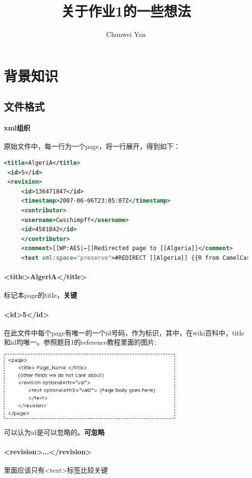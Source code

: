 \documentclass[a4paper]{ctexart}
\author{Chunwei Yan}
\title{关于作业1的一些想法}
\begin{document}
    \maketitle
\section{背景知识}
	\subsection{文件格式}
	
\paragraph{xml组织}
原始文件中，每一行为一个page，将一行展开，得到如下：
\begin{lstlisting}[language=XML]
 <title>AlgeriA</title>     
 <id>5</id>     
 <revision>       
	 <id>136471847</id>       
	 <timestamp>2007-06-06T23:05:07Z</timestamp>       
	 <contributor>         
	 <username>Cwschimpff</username>         
	 <id>4581842</id>       
	 </contributor>       
	 <comment>[[WP:AES|←]]Redirected page to [[Algeria]]</comment>       
	 <text xml:space="preserve">#REDIRECT [[Algeria]] {{R from CamelCase}}</text>     </revision>
\end{lstlisting}
\paragraph{ <title>AlgeriA</title>}
标记本page的title，\textbf{关键}
\paragraph{
 <id>5</id>     
}
在此文件中每个page有唯一的一个id号码，作为标识，其中，在wiki百科中，title和id均唯一。参照题目1的reference教程里面的图片;
\begin{center} 
    \includegraphics[width=0.7\textwidth]{image001.png}
\end{center}
可以认为id是可以忽略的。\textbf{可忽略}
\paragraph{
 <revision>...</revision>
}
里面应该只有<text>标签比较关键
\end{document}
